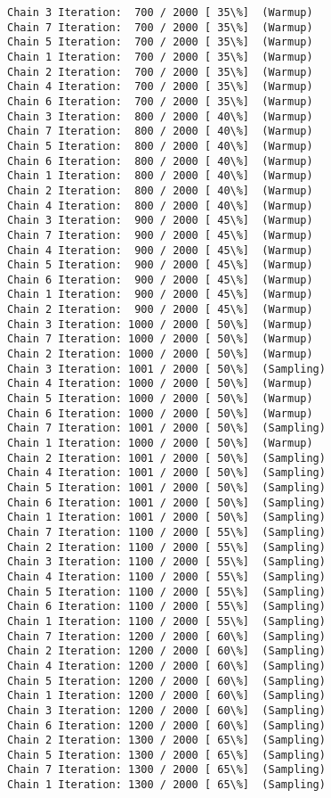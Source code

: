\documentclass[11pt]{article}
\begin{document}
\begin{Verbatim}[commandchars=\\\{\}]
Chain 3 Iteration:  700 / 2000 [ 35\%]  (Warmup)
Chain 7 Iteration:  700 / 2000 [ 35\%]  (Warmup)
Chain 5 Iteration:  700 / 2000 [ 35\%]  (Warmup)
Chain 1 Iteration:  700 / 2000 [ 35\%]  (Warmup)
Chain 2 Iteration:  700 / 2000 [ 35\%]  (Warmup)
Chain 4 Iteration:  700 / 2000 [ 35\%]  (Warmup)
Chain 6 Iteration:  700 / 2000 [ 35\%]  (Warmup)
Chain 3 Iteration:  800 / 2000 [ 40\%]  (Warmup)
Chain 7 Iteration:  800 / 2000 [ 40\%]  (Warmup)
Chain 5 Iteration:  800 / 2000 [ 40\%]  (Warmup)
Chain 6 Iteration:  800 / 2000 [ 40\%]  (Warmup)
Chain 1 Iteration:  800 / 2000 [ 40\%]  (Warmup)
Chain 2 Iteration:  800 / 2000 [ 40\%]  (Warmup)
Chain 4 Iteration:  800 / 2000 [ 40\%]  (Warmup)
Chain 3 Iteration:  900 / 2000 [ 45\%]  (Warmup)
Chain 7 Iteration:  900 / 2000 [ 45\%]  (Warmup)
Chain 4 Iteration:  900 / 2000 [ 45\%]  (Warmup)
Chain 5 Iteration:  900 / 2000 [ 45\%]  (Warmup)
Chain 6 Iteration:  900 / 2000 [ 45\%]  (Warmup)
Chain 1 Iteration:  900 / 2000 [ 45\%]  (Warmup)
Chain 2 Iteration:  900 / 2000 [ 45\%]  (Warmup)
Chain 3 Iteration: 1000 / 2000 [ 50\%]  (Warmup)
Chain 7 Iteration: 1000 / 2000 [ 50\%]  (Warmup)
Chain 2 Iteration: 1000 / 2000 [ 50\%]  (Warmup)
Chain 3 Iteration: 1001 / 2000 [ 50\%]  (Sampling)
Chain 4 Iteration: 1000 / 2000 [ 50\%]  (Warmup)
Chain 5 Iteration: 1000 / 2000 [ 50\%]  (Warmup)
Chain 6 Iteration: 1000 / 2000 [ 50\%]  (Warmup)
Chain 7 Iteration: 1001 / 2000 [ 50\%]  (Sampling)
Chain 1 Iteration: 1000 / 2000 [ 50\%]  (Warmup)
Chain 2 Iteration: 1001 / 2000 [ 50\%]  (Sampling)
Chain 4 Iteration: 1001 / 2000 [ 50\%]  (Sampling)
Chain 5 Iteration: 1001 / 2000 [ 50\%]  (Sampling)
Chain 6 Iteration: 1001 / 2000 [ 50\%]  (Sampling)
Chain 1 Iteration: 1001 / 2000 [ 50\%]  (Sampling)
Chain 7 Iteration: 1100 / 2000 [ 55\%]  (Sampling)
Chain 2 Iteration: 1100 / 2000 [ 55\%]  (Sampling)
Chain 3 Iteration: 1100 / 2000 [ 55\%]  (Sampling)
Chain 4 Iteration: 1100 / 2000 [ 55\%]  (Sampling)
Chain 5 Iteration: 1100 / 2000 [ 55\%]  (Sampling)
Chain 6 Iteration: 1100 / 2000 [ 55\%]  (Sampling)
Chain 1 Iteration: 1100 / 2000 [ 55\%]  (Sampling)
Chain 7 Iteration: 1200 / 2000 [ 60\%]  (Sampling)
Chain 2 Iteration: 1200 / 2000 [ 60\%]  (Sampling)
Chain 4 Iteration: 1200 / 2000 [ 60\%]  (Sampling)
Chain 5 Iteration: 1200 / 2000 [ 60\%]  (Sampling)
Chain 1 Iteration: 1200 / 2000 [ 60\%]  (Sampling)
Chain 3 Iteration: 1200 / 2000 [ 60\%]  (Sampling)
Chain 6 Iteration: 1200 / 2000 [ 60\%]  (Sampling)
Chain 2 Iteration: 1300 / 2000 [ 65\%]  (Sampling)
Chain 5 Iteration: 1300 / 2000 [ 65\%]  (Sampling)
Chain 7 Iteration: 1300 / 2000 [ 65\%]  (Sampling)
Chain 1 Iteration: 1300 / 2000 [ 65\%]  (Sampling)

\end{Verbatim}
\end{document}
